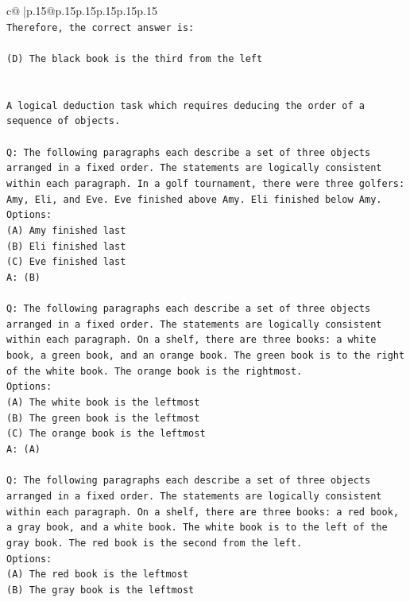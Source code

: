 \documentclass{article}
\begin{document}
{\begin{supertabular}{c@{$\;$}|p{.15\linewidth}@{}p{.15\linewidth}p{.15\linewidth}p{.15\linewidth}p{.15\linewidth}p{.15\linewidth}}
{{{\\ 
\texttt{Therefore, the correct answer is:} \\
\\ 
\texttt{(D) The black book is the third from the left} \\
\\ 
\\ 
\texttt{A logical deduction task which requires deducing the order of a sequence of objects.} \\
\\ 
\texttt{Q: The following paragraphs each describe a set of three objects arranged in a fixed order. The statements are logically consistent within each paragraph. In a golf tournament, there were three golfers: Amy, Eli, and Eve. Eve finished above Amy. Eli finished below Amy.} \\
\texttt{Options:} \\
\texttt{(A) Amy finished last} \\
\texttt{(B) Eli finished last} \\
\texttt{(C) Eve finished last} \\
\texttt{A: (B)} \\
\\ 
\texttt{Q: The following paragraphs each describe a set of three objects arranged in a fixed order. The statements are logically consistent within each paragraph. On a shelf, there are three books: a white book, a green book, and an orange book. The green book is to the right of the white book. The orange book is the rightmost.} \\
\texttt{Options:} \\
\texttt{(A) The white book is the leftmost} \\
\texttt{(B) The green book is the leftmost} \\
\texttt{(C) The orange book is the leftmost} \\
\texttt{A: (A)} \\
\\ 
\texttt{Q: The following paragraphs each describe a set of three objects arranged in a fixed order. The statements are logically consistent within each paragraph. On a shelf, there are three books: a red book, a gray book, and a white book. The white book is to the left of the gray book. The red book is the second from the left.} \\
\texttt{Options:} \\
\texttt{(A) The red book is the leftmost} \\
\texttt{(B) The gray book is the leftmost} \\
}}}
\end{supertabular}}
\end{document}
